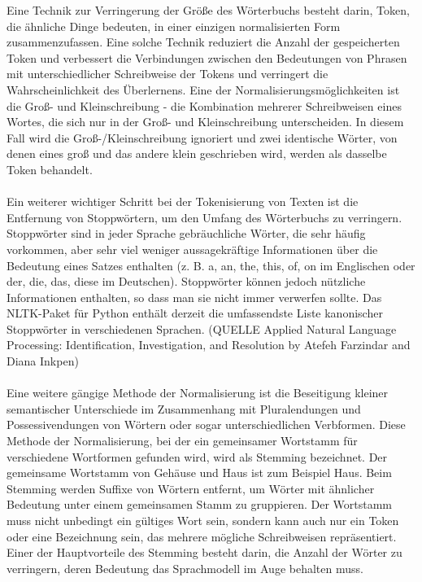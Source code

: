 Eine Technik zur Verringerung der Größe des Wörterbuchs besteht darin, Token, die ähnliche Dinge bedeuten, in einer einzigen normalisierten Form zusammenzufassen. 
Eine solche Technik reduziert die Anzahl der gespeicherten Token und verbessert die Verbindungen zwischen den Bedeutungen von Phrasen mit unterschiedlicher \glqq{}Schreibweise\grqq{} der Tokens und verringert die Wahrscheinlichkeit des Überlernens. 
Eine der Normalisierungsmöglichkeiten ist die Groß- und Kleinschreibung - die Kombination mehrerer Schreibweisen eines Wortes, die sich nur in der Groß- und Kleinschreibung unterscheiden. 
In diesem Fall wird die Groß-/Kleinschreibung ignoriert und zwei identische Wörter, von denen eines groß und das andere klein geschrieben wird, werden als dasselbe Token behandelt.\\\\
Ein weiterer wichtiger Schritt bei der Tokenisierung von Texten ist die Entfernung von Stoppwörtern, um den Umfang des Wörterbuchs zu verringern. 
Stoppwörter sind in jeder Sprache gebräuchliche Wörter, die sehr häufig vorkommen, aber sehr viel weniger aussagekräftige Informationen über die Bedeutung eines Satzes enthalten (z. B. a, an, the, this, of, on im Englischen oder der, die, das, diese im Deutschen). 
Stoppwörter können jedoch nützliche Informationen enthalten, so dass man sie nicht immer verwerfen sollte. 
Das \ac{NLTK}-Paket für Python enthält derzeit die umfassendste Liste kanonischer Stoppwörter in verschiedenen Sprachen. (QUELLE Applied Natural Language Processing: Identification, Investigation, and Resolution by Atefeh Farzindar and Diana Inkpen)\\\\
Eine weitere gängige Methode der Normalisierung ist die Beseitigung kleiner semantischer Unterschiede im Zusammenhang mit Pluralendungen und Possessivendungen von Wörtern oder sogar unterschiedlichen Verbformen. 
Diese Methode der Normalisierung, bei der ein gemeinsamer Wortstamm für verschiedene Wortformen gefunden wird, wird als Stemming bezeichnet. 
Der gemeinsame Wortstamm von \glqq{}Gehäuse\grqq{} und \glqq{}Haus\grqq{} ist zum Beispiel \glqq{}Haus\grqq{}.
 Beim Stemming werden Suffixe von Wörtern entfernt, um Wörter mit ähnlicher Bedeutung unter einem gemeinsamen Stamm zu gruppieren. 
 Der Wortstamm muss nicht unbedingt ein gültiges Wort sein, sondern kann auch nur ein Token oder eine Bezeichnung sein, das mehrere mögliche Schreibweisen repräsentiert. 
 Einer der Hauptvorteile des Stemming besteht darin, die Anzahl der Wörter zu verringern, deren Bedeutung das Sprachmodell im Auge behalten muss. 
